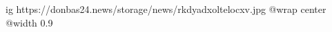  
 
 
 
 

\ifcmt
  ig https://donbas24.news/storage/news/rkdyadxoltelocxv.jpg
  @wrap center
  @width 0.9
\fi
